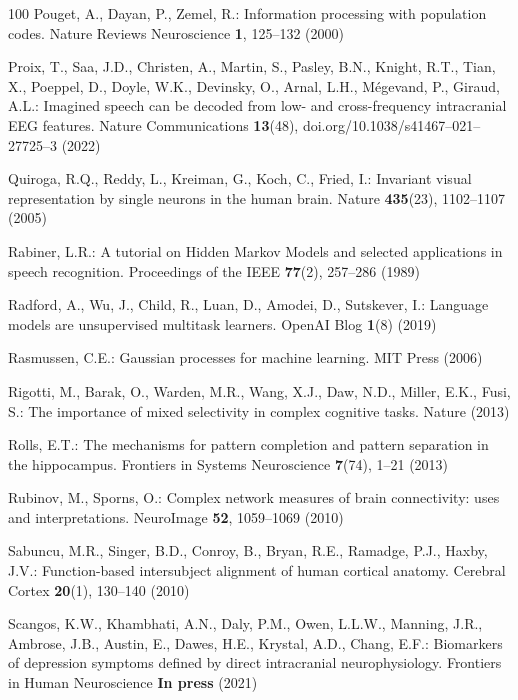 \documentclass[runningheads]{llncs}
\begin{document}
\begin{thebibliography}{100}
Pouget, A., Dayan, P., Zemel, R.: Information processing with population codes.
  Nature Reviews Neuroscience  \textbf{1},  125--132 (2000)

Proix, T., Saa, J.D., Christen, A., Martin, S., Pasley, B.N., Knight, R.T.,
  Tian, X., Poeppel, D., Doyle, W.K., Devinsky, O., Arnal, L.H., M\'{e}gevand,
  P., Giraud, A.L.: Imagined speech can be decoded from low- and
  cross-frequency intracranial {EEG} features. Nature Communications
  \textbf{13}(48),  doi.org/10.1038/s41467--021--27725--3 (2022)

Quiroga, R.Q., Reddy, L., Kreiman, G., Koch, C., Fried, I.: Invariant visual
  representation by single neurons in the human brain. Nature
  \textbf{435}(23),  1102--1107 (2005)

Rabiner, L.R.: A tutorial on {Hidden Markov Models} and selected applications
  in speech recognition. Proceedings of the {IEEE}  \textbf{77}(2),  257--286
  (1989)

Radford, A., Wu, J., Child, R., Luan, D., Amodei, D., Sutskever, I.: Language
  models are unsupervised multitask learners. {OpenAI} Blog  \textbf{1}(8)
  (2019)

Rasmussen, C.E.: {Gaussian} processes for machine learning. {MIT} Press (2006)

Rigotti, M., Barak, O., Warden, M.R., Wang, X.J., Daw, N.D., Miller, E.K.,
  Fusi, S.: The importance of mixed selectivity in complex cognitive tasks.
  Nature  (2013)

Rolls, E.T.: The mechanisms for pattern completion and pattern separation in
  the hippocampus. Frontiers in Systems Neuroscience  \textbf{7}(74),  1--21
  (2013)

Rubinov, M., Sporns, O.: Complex network measures of brain connectivity: uses
  and interpretations. {NeuroImage}  \textbf{52},  1059--1069 (2010)

Sabuncu, M.R., Singer, B.D., Conroy, B., Bryan, R.E., Ramadge, P.J., Haxby,
  J.V.: Function-based intersubject alignment of human cortical anatomy.
  Cerebral Cortex  \textbf{20}(1),  130--140 (2010)

Scangos, K.W., Khambhati, A.N., Daly, P.M., Owen, L.L.W., Manning, J.R.,
  Ambrose, J.B., Austin, E., Dawes, H.E., Krystal, A.D., Chang, E.F.:
  Biomarkers of depression symptoms defined by direct intracranial
  neurophysiology. Frontiers in Human Neuroscience  \textbf{In press} (2021)


\end{thebibliography}
\end{document}
